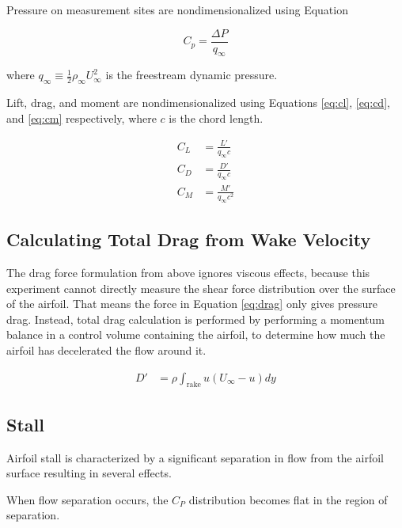 \documentclass[runningheads]{llncs}
\begin{document}
Pressure on measurement sites are nondimensionalized using Equation

\begin{equation}
    C_p = \frac{\Delta P}{q_\infty}
    \label{eq:cp}
\end{equation}

\noindent
where $q_\infty\equiv\frac{1}{2}\rho_\infty U_\infty^2$ is the freestream dynamic pressure.\newline

\noindent
Lift, drag, and moment are nondimensionalized using Equations \ref{eq:cl}, \ref{eq:cd}, and \ref{eq:cm} respectively, where $c$ is the chord length.\newline

\begin{align}
    C_L &= \frac{L'}{q_\infty c}
    \label{eq:cl}\\
    C_D &= \frac{D'}{q_\infty c}
    \label{eq:cd}\\
    C_M &= \frac{M'}{q_\infty c^2}
    \label{eq:cm}
\end{align}

\subsection{Calculating Total Drag from Wake Velocity}

\noindent
The drag force formulation from above ignores viscous effects, because this experiment cannot directly measure the shear force distribution over the surface of the airfoil. That means the force in Equation \ref{eq:drag} only gives pressure drag. Instead, total drag calculation is performed by performing a momentum balance in a control volume containing the airfoil, to determine how much the airfoil has decelerated the flow around it.\newline

\begin{align}
    D' &= \rho\int_{\text{rake}} u (U_\infty - u) dy \label{eq:wake_drag}
\end{align}

\subsection{Stall}

\noindent
Airfoil stall is characterized by a significant separation in flow from the airfoil surface resulting in several effects.\newline

\noindent
When flow separation occurs, the $C_P$ distribution becomes flat in the region of separation.\newline
\end{document}
